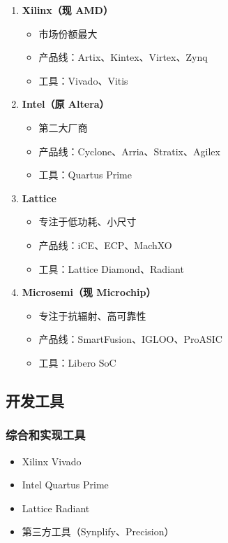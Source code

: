 \begin{enumerate}
  \item \textbf{Xilinx（现 AMD）}
    \begin{itemize}
      \item 市场份额最大
      \item 产品线：Artix、Kintex、Virtex、Zynq
      \item 工具：Vivado、Vitis
    \end{itemize}

  \item \textbf{Intel（原 Altera）}
    \begin{itemize}
      \item 第二大厂商
      \item 产品线：Cyclone、Arria、Stratix、Agilex
      \item 工具：Quartus Prime
    \end{itemize}

  \item \textbf{Lattice}
    \begin{itemize}
      \item 专注于低功耗、小尺寸
      \item 产品线：iCE、ECP、MachXO
      \item 工具：Lattice Diamond、Radiant
    \end{itemize}

  \item \textbf{Microsemi（现 Microchip）}
    \begin{itemize}
      \item 专注于抗辐射、高可靠性
      \item 产品线：SmartFusion、IGLOO、ProASIC
      \item 工具：Libero SoC
    \end{itemize}
\end{enumerate}

\subsection{开发工具}

\subsubsection{综合和实现工具}

\begin{itemize}
  \item Xilinx Vivado
  \item Intel Quartus Prime
  \item Lattice Radiant
  \item 第三方工具（Synplify、Precision）
\end{itemize}

